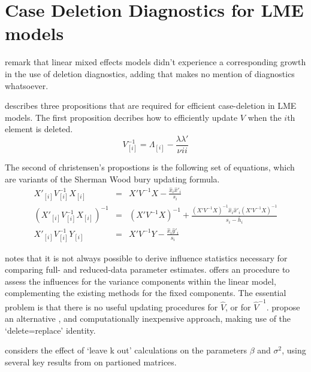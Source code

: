 \documentclass[12pt, a4paper]{report}
\theoremstyle{plain}
\theoremstyle{definition}
\theoremstyle{remark}
\begin{document}
	
	
	\section{Case Deletion Diagnostics for LME models}
	
	\citet{HaslettDillane} remark that linear mixed effects models
	didn't experience a corresponding growth in the use of deletion
	diagnostics, adding that \citet{McCullSearle} makes no mention of
	diagnostics whatsoever.
	
	\citet{Christensen} describes three propositions that are required
	for efficient case-deletion in LME models. The first proposition
	decribes how to efficiently update $V$ when the $i$th element is
	deleted.
	\begin{equation}
	V_{[i]}^{-1} = \Lambda_{[i]} - \frac{\lambda
		\lambda\prime}{\nu^{}ii}
	\end{equation}
	
	
	The second of christensen's propostions is the following set of
	equations, which are variants of the Sherman Wood bury updating
	formula.
	\begin{eqnarray}
	X'_{[i]}V_{[i]}^{-1}X_{[i]} &=& X' V^{-1}X -
	\frac{\hat{x}_{i}\hat{x}'_{i}}{s_{i}}\\
	(X'_{[i]}V_{[i]}^{-1}X_{[i]})^{-1} &=& (X' V^{-1}X)^{-1} +
	\frac{(X' V^{-1}X)^{-1}\hat{x}_{i}\hat{x}' _{i}
		(X' V^{-1}X)^{-1}}{s_{i}- \bar{h}_{i}}\\
	X'_{[i]}V_{[i]}^{-1}Y_{[i]} &=& X\prime V^{-1}Y -
	\frac{\hat{x}_{i}\hat{y}' _{i}}{s_{i}}
	\end{eqnarray}
	
	
	
	
	
	
	\citet{schabenberger} notes that it is not always possible to
	derive influence statistics necessary for comparing full- and
	reduced-data parameter estimates. \citet{HaslettDillane} offers an
	procedure to assess the influences for the variance components
	within the linear model, complementing the existing methods for
	the fixed components. The essential problem is that there is no
	useful updating procedures for $\hat{V}$, or for $\hat{V}^{-1}$.
	\citet{HaslettDillane} propose an alternative , and
	computationally inexpensive approach, making use of the
	`delete=replace' identity.
	
	\citet{Haslett99} considers the effect of `leave k out'
	calculations on the parameters $\beta$ and $\sigma^{2}$, using
	several key results from \citet{HaslettHayes} on partioned
	matrices.
	
\end{document}
